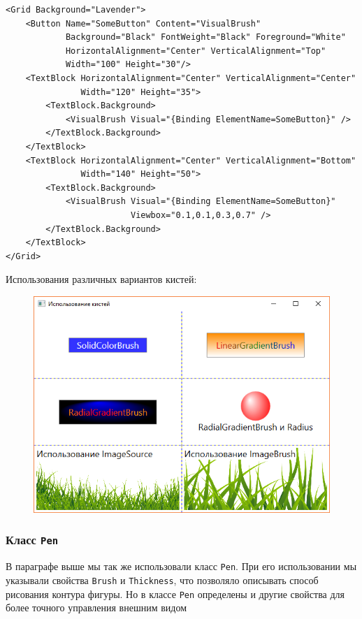 \begin{description}[style=nextline]
\begin{verbatim}
<Grid Background="Lavender">
    <Button Name="SomeButton" Content="VisualBrush" 
            Background="Black" FontWeight="Black" Foreground="White" 
            HorizontalAlignment="Center" VerticalAlignment="Top"
            Width="100" Height="30"/>
    <TextBlock HorizontalAlignment="Center" VerticalAlignment="Center"
               Width="120" Height="35">
        <TextBlock.Background>
            <VisualBrush Visual="{Binding ElementName=SomeButton}" />
        </TextBlock.Background>
    </TextBlock>
    <TextBlock HorizontalAlignment="Center" VerticalAlignment="Bottom"
               Width="140" Height="50">
        <TextBlock.Background>
            <VisualBrush Visual="{Binding ElementName=SomeButton}" 
                         Viewbox="0.1,0.1,0.3,0.7" />
        </TextBlock.Background>
    </TextBlock>
</Grid>
\end{verbatim}

\end{description}

Использования различных вариантов кистей:
\begin{figure}[H]
\centering
\includegraphics[width=1\textwidth]{brushes.png}
\end{figure}


\newpage
\subsubsection{Класс \texttt{Pen}}

В параграфе выше мы так же использовали класс \texttt{Pen}. При его использовании мы указывали свойства \texttt{Brush} и \texttt{Thickness}, что позволяло описывать способ рисования контура фигуры. Но в классе \texttt{Pen} определены и другие свойства для более точного управления внешним видом

